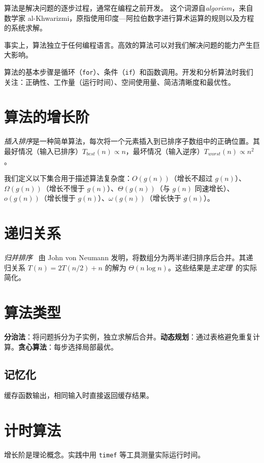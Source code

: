 \documentclass[justified, sixbynine]{tufte-book}
\def\ft{\small\tt}
\theoremstyle{plain}%
\newtheorem * {corollary}{推论}
\theoremstyle{definition}
\theoremstyle{remark}
\newtheorem * {remark}{注记}
\newtheorem * {note}{注释}
\begin{document}
\begin{fullwidth}
算法是解决问题的逐步过程，通常在编程之前开发。
这个词源自{\it algorism}，来自数学家 al-Khwarizmi，原指使用印度—阿拉伯数字进行算术运算的规则以及方程的系统求解。

事实上，算法独立于任何编程语言。高效的算法可以对我们解决问题的能力产生巨大影响。

算法的基本步骤是循环（{\ft for}）、条件（{\ft if}）和函数调用。开发和分析算法时我们关注：正确性、工作量（运行时间）、空间使用量、简洁清晰度和最优性。

\goodbreak\section{算法的增长阶}

{\it 插入排序}是一种简单算法，每次将一个元素插入到已排序子数组中的正确位置。其最好情况（输入已排序）$T_{best}(n) \propto n$，最坏情况（输入逆序）$T_{worst}(n) \propto n^2$。

我们定义以下集合用于描述算法复杂度：$O(g(n))$（增长不超过 $g(n)$）、$\Omega(g(n))$（增长不慢于 $g(n)$）、$\Theta(g(n))$（与 $g(n)$ 同速增长）、$o(g(n))$（增长慢于 $g(n)$）、$\omega(g(n))$（增长快于 $g(n)$）。

\goodbreak\section{递归关系}

{\it 归并排序}~\cite{mergesort} 由 John von Neumann 发明，将数组分为两半递归排序后合并。其递归关系 $T(n) = 2T(n/2) + n$ 的解为 $\Theta(n\log n)$。这些结果是{\it 主定理}~\cite{mastertheorem}的实际简化。

\goodbreak\section{算法类型}

{\bf 分治法}：将问题拆分为子实例，独立求解后合并。{\bf 动态规划}：通过表格避免重复计算。{\bf 贪心算法}：每步选择局部最优。

\subsection{记忆化}
缓存函数输出，相同输入时直接返回缓存结果。

\goodbreak\section{计时算法}
增长阶是理论概念。实践中用 {\ft timef} 等工具测量实际运行时间。


\end{fullwidth}
\end{document}

